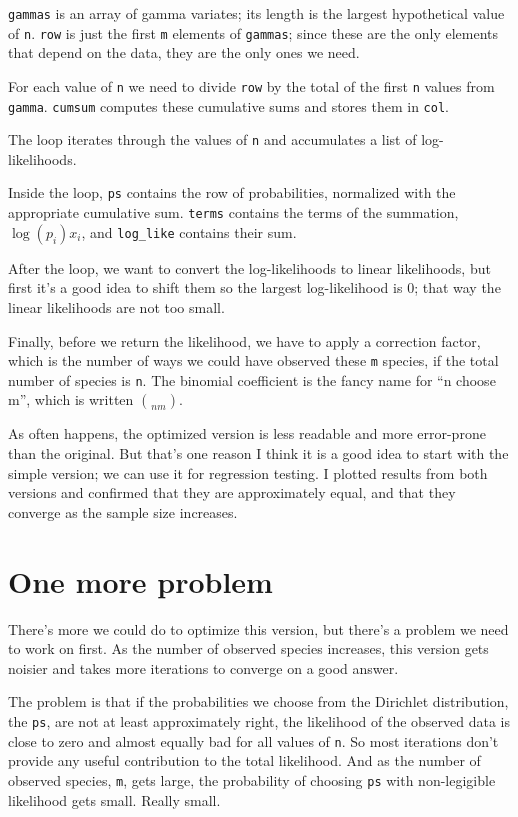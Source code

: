 \documentclass[12pt]{book}
\begin{document}
{\tt gammas} is an array of gamma variates; its length is the largest
hypothetical value of {\tt n}.  {\tt row} is just the first {\tt m}
elements of {\tt gammas}; since these are the only elements that depend on
the data, they are the only ones we need.

For each value of {\tt n} we need to divide {\tt row} by the
total of the first {\tt n} values from {\tt gamma}.  {\tt cumsum}
computes these cumulative sums and stores them in {\tt col}.

The loop iterates through the values of {\tt n} and accumulates
a list of log-likelihoods.

Inside the loop, {\tt ps} contains the row of probabilities, normalized
with the appropriate cumulative sum.  {\tt terms} contains the
terms of the summation, $\log(p_i) x_i$, and \verb"log_like" contains
their sum.

After the loop, we want to convert the log-likelihoods to linear
likelihoods, but first it's a good idea to shift them so the largest
log-likelihood is 0; that way the linear likelihoods are not too
small.

Finally, before we return the likelihood, we have to apply a correction
factor, which is the number of ways we could have observed these {\tt m}
species, if the total number of species is {\tt n}.  The binomial
coefficient is the fancy name for ``n choose m'', which is written
$\choose{n}{m}$. 

As often happens, the optimized version is less readable and more
error-prone than the original.  But that's one reason I think it is
a good idea to start with the simple version; we can use it for
regression testing.  I plotted results from both versions and confirmed
that they are approximately equal, and that they converge as the
sample size increases.

\section{One more problem}

There's more we could do to optimize this version, but there's a 
problem we need to work on first.  As the number of observed
species increases, this version gets noisier and takes more
iterations to converge on a good answer.

The problem is that if the probabilities we choose from the Dirichlet
distribution, the {\tt ps}, are not at least approximately right,
the likelihood of the observed data is close to zero and almost
equally bad for all values of {\tt n}.  So most iterations don't
provide any useful contribution to the total likelihood.  And as the
number of observed species, {\tt m}, gets large, the probability of
choosing {\tt ps} with non-legigible likelihood gets small.  Really
small.
\end{document}
